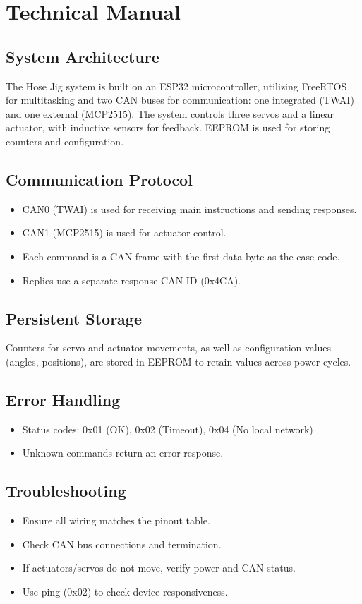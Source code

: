 \documentclass[12pt,a4paper]{article}
\begin{document}
\section{Technical Manual}
\subsection{System Architecture}
The Hose Jig system is built on an ESP32 microcontroller, utilizing FreeRTOS for multitasking and two CAN buses for communication: one integrated (TWAI) and one external (MCP2515). The system controls three servos and a linear actuator, with inductive sensors for feedback. EEPROM is used for storing counters and configuration.

\subsection{Communication Protocol}
\begin{itemize}
    \item CAN0 (TWAI) is used for receiving main instructions and sending responses.
    \item CAN1 (MCP2515) is used for actuator control.
    \item Each command is a CAN frame with the first data byte as the case code.
    \item Replies use a separate response CAN ID (0x4CA).
\end{itemize}

\subsection{Persistent Storage}
Counters for servo and actuator movements, as well as configuration values (angles, positions), are stored in EEPROM to retain values across power cycles.

\subsection{Error Handling}
\begin{itemize}
    \item Status codes: 0x01 (OK), 0x02 (Timeout), 0x04 (No local network)
    \item Unknown commands return an error response.
\end{itemize}

\subsection{Troubleshooting}
\begin{itemize}
    \item Ensure all wiring matches the pinout table.
    \item Check CAN bus connections and termination.
    \item If actuators/servos do not move, verify power and CAN status.
    \item Use ping (0x02) to check device responsiveness.
\end{itemize}
\end{document}
